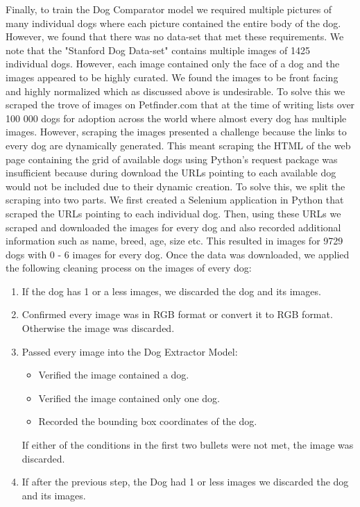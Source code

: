 \documentclass{article}
\begin{document}
Finally, to train the Dog Comparator model we required multiple pictures of many individual dogs where each picture contained the entire body of the dog.  However, we found that there was no data-set that met these requirements.  We note that the "Stanford Dog Data-set" \cite{stanforddogs} contains multiple images of 1425 individual dogs.  However, each image contained only the face of a dog and the images appeared to be highly curated.  We found the images to be front facing and highly normalized which as discussed above is undesirable.  To solve this we scraped the trove of images on Petfinder.com that at the time of writing lists over 100 000 dogs for adoption across the world where almost every dog has multiple images.  However, scraping the images presented a challenge because the links to every dog are dynamically generated.  This meant scraping the HTML of the web page containing the grid of available dogs using Python's request package was insufficient because during download the URLs pointing to each available dog would not be included due to their dynamic creation.  To solve this, we split the scraping into two parts.  We first created a Selenium application in Python that scraped the URLs pointing to each individual dog.  Then, using these URLs we scraped and downloaded the images for every dog and also recorded additional information such as name, breed, age, size etc.  This resulted in images for 9729 dogs with 0 - 6 images for every dog.  Once the data was downloaded, we applied the following cleaning process on the images of every dog:
\begin{enumerate}
  
  \item If the dog has 1 or a less images, we discarded the dog and its images.
  
  \item Confirmed every image was in RGB format or convert it to RGB format.  Otherwise the image was discarded.
  
  \item Passed every image into the Dog Extractor Model:
    \begin{itemize}
      \item Verified the image contained a dog.
      \item Verified the image contained only one dog.
      \item Recorded the bounding box coordinates of the dog.
    \end{itemize}
    If either of the conditions in the first two bullets were not met, the image was discarded.
    
  \item If after the previous step, the Dog had 1 or less images we discarded the dog and its images.
  
\end{enumerate}
\end{document}
